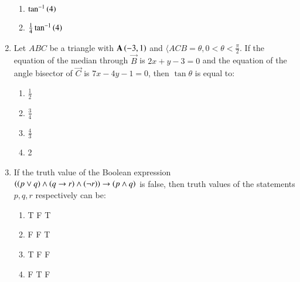 \documentclass[journal,12pt,onecolumn]{IEEEtran}
\theoremstyle{remark}
\begin{document}
\begin{enumerate}
\begin{enumerate}
            \item $\tan^{-1}\left(4\right)$
            \item $\frac{1}{4}\tan^{-1}\left(4\right)$
        \end{enumerate}
        \item Let $ABC$ be a triangle with $\mathbf{A}\left(-3,1\right)$ and $\langle ACB=\theta,0<\theta<\frac{\pi}{2}$. If the equation of the median through $\vec{B}$ is $2x+y-3=0$ and the equation of the angle bisector of $\vec{C}$ is $7x-4y-1=0$, then $\tan \theta$ is equal to:
        \begin{enumerate}
            \item $\frac{1}{2}$
            \item $\frac{3}{4}$
            \item $\frac{4}{3}$
            \item 2
        \end{enumerate}
        \item If the truth value of the Boolean expression $\left(\left(p \lor q\right) \land \left(q\rightarrow r\right) \land \left(\neg r\right)\right)\rightarrow \left(p \land q\right)$ is false, then truth values of the statements $p,q,r$ respectively can be:
        \begin{enumerate}
            \item T F T
            \item F F T
            \item T F F
            \item F T F
        \end{enumerate}
        \end{enumerate}
\end{document}

